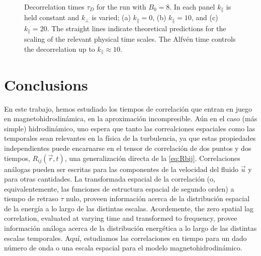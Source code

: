 \begin{figure}
  \centering


  \caption{Decorrelation times $\tau_D$ for the run with $B_0=8$. In each
    panel $k_\parallel$ is held constant and $k_\perp$ is varied; (a)
    $k_\parallel = 0$, (b) $k_\parallel = 10$, and (c) $k_\parallel =
    20$. The straight lines indicate theoretical predictions for
    the scaling of the relevant physical time scales. The Alfv\'en
    time controls the decorrelation up to $k_\parallel \approx 10$.}
  \label{fig5:B8_bvf_b_kpara}
\end{figure}


\section{Conclusions}\label{sec_Conclusions}

En este trabajo, hemos estudiado los tiempos de correlación que entran
en juego en magnetohidrodinámica, en la aproximación
incompresible. Aún en el caso (más simple) hidrodinámico, uno espera
que tanto las correalciones espaciales como las temporales sean
relevantes en la física de la turbulencia, ya que estas propiedades
independientes puede encarnarse en el tensor de correlación de dos
puntos y dos tiempos, $R_{ij}(\vec{r},t)$, una generalización directa
de la \cref{eq:Rbij}. Correlaciones análogas pueden ser escritas para
las componentes de la velocidad del fluido $\vec{u}$ y para otras
cantidades.  La transformada espacial de la correlación (o,
equivalentemente, las funciones de estructura espacial de segundo
orden) a tiempo de retraso $\tau$ nulo, proveen información acerca de
la distribución espacial de la energía a lo largo de las distintas
escalas. Acordemente, {\color{red}the zero spatial lag correlation,
  evaluated at varying time and transformed to frequency}, provee
información análoga acerca de la distribución energética a lo largo de
las distintas escalas temporales. Aquí, estudiamos las correlaciones
en tiempo para un dado número de onda o una escala espacial para el
modelo magnetohidrodinámico.

